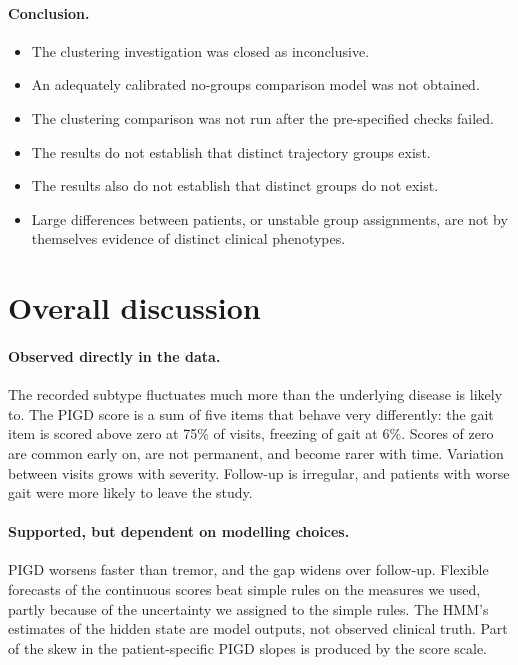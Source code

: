 \documentclass[11pt,a4paper]{article}
\begin{document}
\paragraph{Conclusion.}

\begin{itemize}
  \item The clustering investigation was closed as inconclusive.
  \item An adequately calibrated no-groups comparison model was not obtained.
  \item The clustering comparison was not run after the pre-specified checks
        failed.
  \item The results do not establish that distinct trajectory groups exist.
  \item The results also do not establish that distinct groups do not exist.
  \item Large differences between patients, or unstable group assignments, are
        not by themselves evidence of distinct clinical phenotypes.
\end{itemize}

\section{Overall discussion}

\paragraph{Observed directly in the data.} The recorded subtype fluctuates
much more than the underlying disease is likely to. The PIGD score is a sum of
five items that behave very differently: the gait item is scored above zero at
75\% of visits, freezing of gait at 6\%. Scores of zero are common early on,
are not permanent, and become rarer with time. Variation between visits grows
with severity. Follow-up is irregular, and patients with worse gait were more
likely to leave the study.

\paragraph{Supported, but dependent on modelling choices.} PIGD worsens faster
than tremor, and the gap widens over follow-up. Flexible forecasts of the
continuous scores beat simple rules on the measures we used, partly because
of the uncertainty we assigned to the simple rules. The HMM's estimates of
the hidden state are model outputs, not observed clinical truth. Part of the
skew in the patient-specific PIGD slopes is produced by the score scale.
\end{document}
